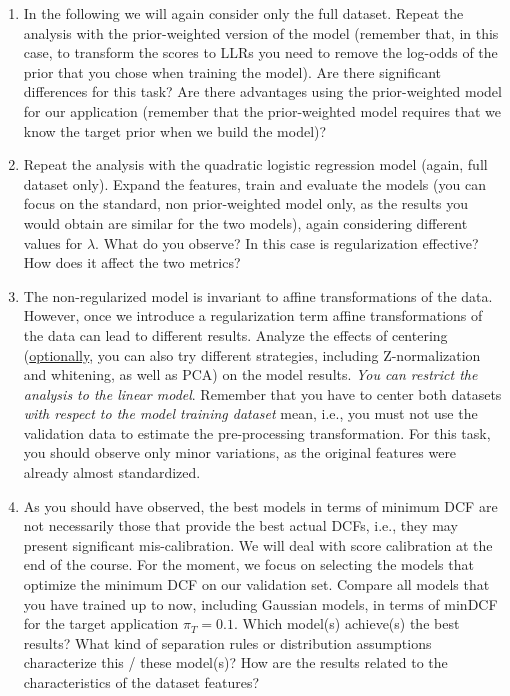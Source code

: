 \documentclass[a4paper, 12pt, english]{article}
\begin{document}
\begin{enumerate}
        \item In the following we will again consider only the full dataset. Repeat the analysis with the prior-weighted version of the model (remember that, in this case, to transform the scores to LLRs you need to remove the log-odds of the prior that you chose when training the model). Are there significant differences for this task? Are there advantages using the prior-weighted model for our application (remember that the prior-weighted model requires that we know the target prior when we build the model)?
        \item Repeat the analysis with the quadratic logistic regression model (again, full dataset only). Expand the features, train and evaluate the models (you can focus on the standard, non prior-weighted model only, as the results you would obtain are similar for the two models), again considering different values for \(\lambda\). What do you observe? In this case is regularization effective? How does it affect the two metrics?
        \item The non-regularized model is invariant to affine transformations of the data. However, once we introduce a regularization term affine transformations of the data can lead to different results. Analyze the effects of centering (\underline{optionally}, you can also try different strategies, including Z-normalization and whitening, as well as PCA) on the model results. \textit{You can restrict the analysis to the linear model}. Remember that you have to center both datasets \textit{with respect to the model training dataset} mean, i.e., you must not use the validation data to estimate the pre-processing transformation. For this task, you should observe only minor variations, as the original features were already almost standardized.
        \item As you should have observed, the best models in terms of minimum DCF are not necessarily those that provide the best actual DCFs, i.e., they may present significant mis-calibration. We will deal with score calibration at the end of the course. For the moment, we focus on selecting the models that optimize the minimum DCF on our validation set. Compare all models that you have trained up to now, including Gaussian models, in terms of minDCF for the target application \(\pi_T = 0.1\). Which model(s) achieve(s) the best results? What kind of separation rules or distribution assumptions characterize this / these model(s)? How are the results related to the characteristics of the dataset features?
    \end{enumerate}
\end{document}
